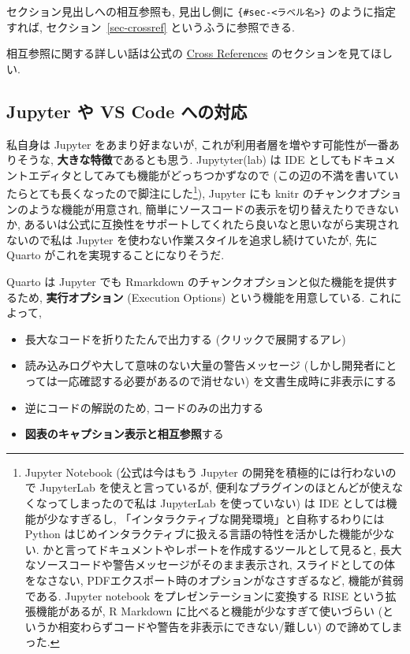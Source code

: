 \documentclass[
  letterpaper,
  DIV=11,
  pandoc,
  ja=standard,
  jafont=noto-otf]{bxjsarticle}
\providecommand{\tightlist}{%
  \setlength{\itemsep}{0pt}\setlength{\parskip}{0pt}}
\begin{document}
セクション見出しへの相互参照も, 見出し側に
\texttt{\{\#sec-\textless{}ラベル名\textgreater{}\}} のように指定すれば,
セクション~\ref{sec-crossref} というふうに参照できる.

相互参照に関する詳しい話は公式の
\href{https://quarto.org/docs/authoring/cross-references.html}{Cross
References} のセクションを見てほしい.

\hypertarget{sec-jupyter-vs-code}{%
\subsection{Jupyter や VS Code への対応}\label{sec-jupyter-vs-code}}

私自身は Jupyter をあまり好まないが,
これが利用者層を増やす可能性が一番ありそうな,
\textbf{大きな特徴}であるとも思う. Jupytyter(lab) は IDE
としてもドキュメントエディタとしてみても機能がどっちつかずなので
(この辺の不満を書いていたらとても長くなったので脚注にした\footnote{Jupyter
  Notebook (公式は今はもう Jupyter の開発を積極的には行わないので
  JupyterLab を使えと言っているが,
  便利なプラグインのほとんどが使えなくなってしまったので私は JupyterLab
  を使っていない) は IDE としては機能が少なすぎるし,
  「インタラクティブな開発環境」と自称するわりには Python
  はじめインタラクティブに扱える言語の特性を活かした機能が少ない.
  かと言ってドキュメントやレポートを作成するツールとして見ると,
  長大なソースコードや警告メッセージがそのまま表示され,
  スライドとしての体をなさない,
  PDFエクスポート時のオプションがなさすぎるなど, 機能が貧弱である.
  Jupyter notebook をプレゼンテーションに変換する RISE
  という拡張機能があるが, R Markdown
  に比べると機能が少なすぎて使いづらい
  (というか相変わらずコードや警告を非表示にできない/難しい)
  ので諦めてしまった.}), Jupyter にも knitr
のチャンクオプションのような機能が用意され,
簡単にソースコードの表示を切り替えたりできないか,
あるいは公式に互換性をサポートしてくれたら良いなと思いながら実現されないので私は
Jupyter を使わない作業スタイルを追求し続けていたが, 先に Quarto
がこれを実現することになりそうだ.

Quarto は Jupyter でも Rmarkdown
のチャンクオプションと似た機能を提供するため, \textbf{実行オプション}
(Execution Options) という機能を用意している. これによって,

\begin{itemize}
\tightlist
\item
  長大なコードを折りたたんで出力する (クリックで展開するアレ)
\item
  読み込みログや大して意味のない大量の警告メッセージ
  (しかし開発者にとっては一応確認する必要があるので消せない)
  を文書生成時に非表示にする
\item
  逆にコードの解説のため, コードのみの出力する
\item
  \textbf{図表のキャプション表示と相互参照}する
\end{itemize}
\end{document}
